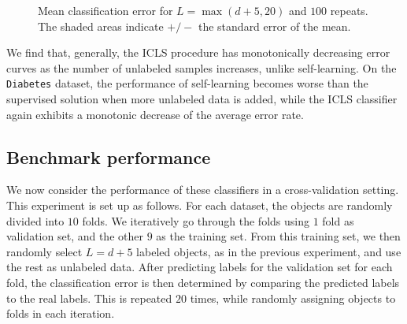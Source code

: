 \documentclass{llncs}
\newcommand{\featdim}{d}
\newcommand{\Nlab}{L}
\begin{document}
\begin{figure}[t] 
  \centering
      \hspace*{-3.0cm}
      
  \caption{Mean classification error for $\Nlab=\max(\featdim+5,20)$ and $100$ repeats. The shaded areas indicate $+/-$ the standard error of the mean.} \label{fig:learningcurves1}
\end{figure}

We find that, generally, the ICLS procedure has monotonically decreasing error curves as the number of unlabeled samples increases, unlike self-learning. On the \texttt{Diabetes} dataset, the performance of self-learning becomes worse than the supervised solution when more unlabeled data is added, while the ICLS classifier again exhibits a monotonic decrease of the average error rate. 


\subsection{Benchmark performance}
We now consider the performance of these classifiers in a cross-validation setting. This experiment is set up as follows. For each dataset, the objects are randomly divided into $10$ folds. We iteratively go through the folds using $1$ fold as validation set, and the other $9$ as the training set. From this training set, we then randomly select $\Nlab=\featdim+5$ labeled objects, as in the previous experiment, and use the rest as unlabeled data. After predicting labels for the validation set for each fold, the classification error is then determined by comparing the predicted labels to the real labels. This is repeated $20$ times, while randomly assigning objects to folds in each iteration.

\end{document}
